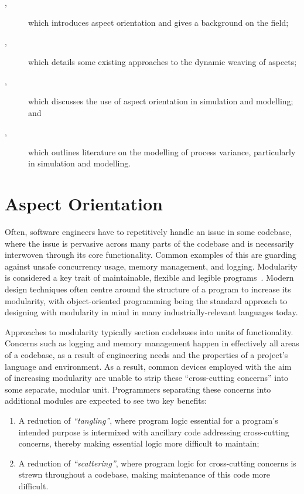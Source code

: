 \begin{description}

    \item[,] which introduces aspect orientation and
    gives a background on the field;
    \item[,] which details some existing approaches
    to the dynamic weaving of aspects;
    \item[,] which discusses the use of aspect
    orientation in simulation and modelling; and
    \item[,] which outlines literature on the modelling
    of process variance, particularly in simulation and modelling.

\end{description}


\section{Aspect Orientation}\label{lit_review_AOP_explainer}

Often, software engineers have to repetitively handle an issue in some codebase,
where the issue is pervasive across many parts of the codebase and is
necessarily interwoven through its core functionality. Common examples of this
are guarding against unsafe concurrency usage, memory management, and logging.
Modularity is considered a key trait of maintainable, flexible and legible
programs~\cite{Parnas_1972}. Modern design techniques often centre around the
structure of a program to increase its modularity, with object-oriented
programming being the standard approach to designing with modularity in mind in
many industrially-relevant languages today. 

Approaches to modularity typically section codebases into units of
functionality. Concerns such as logging and memory management happen in
effectively all areas of a codebase, as a result of engineering needs and the
properties of a project's language and environment. As a result, common devices
employed with the aim of increasing modularity are unable to strip these
``cross-cutting concerns'' into some separate, modular unit. Programmers
separating these concerns into additional modules are expected to see two key
benefits:

\begin{enumerate}
    \item A reduction of \emph{``tangling''}, where program logic essential for
    a program's intended purpose is intermixed with ancillary code addressing
    cross-cutting concerns, thereby making essential logic more difficult to maintain;
    \item A reduction of \emph{``scattering''}, where program logic for
    cross-cutting concerns is strewn throughout a codebase, making maintenance
    of this code more difficult.
\end{enumerate}

